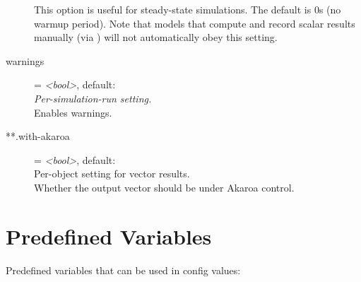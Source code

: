 \begin{description}
    This option is useful for steady-state simulations. The default is 0s (no
    warmup period). Note that models that compute and record scalar results
    manually (via ) will not automatically obey this
    setting.
\item[warnings] = \textit{<bool>}, default: \\
    \textit{Per-simulation-run setting.}\\
    Enables warnings.
\item[**.with-akaroa] = \textit{<bool>}, default: \\
    Per-object setting for vector results.\\
    Whether the output vector should be under Akaroa control.
 \end{description}
 
\section{Predefined Variables}
\label{sec:config-options:predefined-variables}

Predefined variables that can be used in config values:

